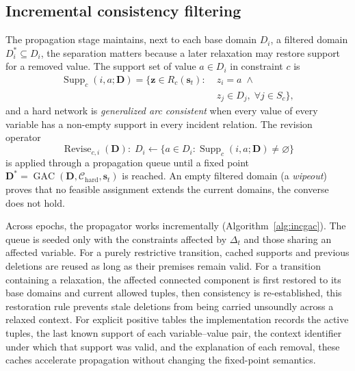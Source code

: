 \documentclass[pdflatex,sn-mathphys-num,iicol,oneside]{sn-jnl}
\begin{document}
\subsection{Incremental consistency filtering}
\label{sec:gac}

The propagation stage maintains, next to each base domain $D_i$, a
filtered domain $D_i^{*}\subseteq D_i$, the separation matters because
a later relaxation may restore support for a removed value. The
support set of value $a\in D_i$ in constraint $c$ is
\begin{equation}
\begin{aligned}
\operatorname{Supp}_{c}(i,a;\bm{D})=
\bigl\{\bm{z}\in R_c(\bm{s}_t):\;
&z_i=a \;\land\\[-1pt]
&z_j\in D_j,\;\forall j\in S_c\bigr\},
\end{aligned}
\label{eq:support}
\end{equation}
and a hard network is \emph{generalized arc consistent} when every
value of every variable has a non-empty support in every incident
relation. The revision operator
\begin{equation}
\operatorname{Revise}_{c,i}(\bm{D}):\;
D_i\leftarrow
\{a\in D_i:\operatorname{Supp}_{c}(i,a;\bm{D})\neq\varnothing\}
\label{eq:revise}
\end{equation}
is applied through a propagation queue until a fixed point
$\bm{D}^{*}=\operatorname{GAC}(\bm{D},\mathcal{C}_{\mathrm{hard}},\bm{s}_t)$
is reached. An empty filtered domain (a \emph{wipeout}) proves that no
feasible assignment extends the current domains, the converse does not
hold.

Across epochs, the propagator works incrementally
(Algorithm~\ref{alg:incgac}). The queue is seeded only with the
constraints affected by $\Delta_t$ and those sharing an affected
variable. For a purely restrictive transition, cached supports and
previous deletions are reused as long as their premises remain valid.
For a transition containing a relaxation, the affected connected
component is first restored to its base domains and current allowed
tuples, then consistency is re-established, this restoration rule
prevents stale deletions from being carried unsoundly across a relaxed
context. For explicit positive tables the implementation records the
active tuples, the last known support of each variable--value pair,
the context identifier under which that support was valid, and the
explanation of each removal, these caches accelerate propagation
without changing the fixed-point semantics.
\end{document}
